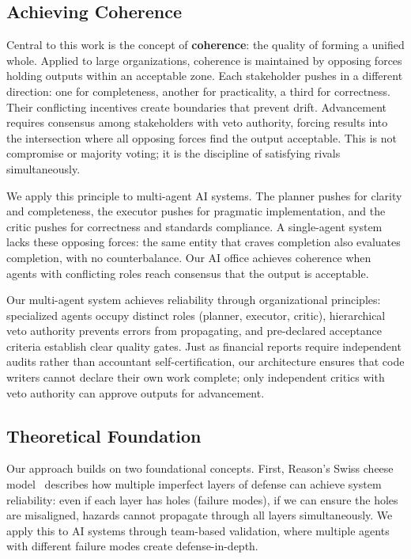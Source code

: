 \documentclass[sigconf]{acmart}
\newcommand{\reviewnote}[1]{}
\newcommand{\reviewnote}[1]{\marginnote{\raggedright\footnotesize\textit{#1}}}
\begin{document}
\subsection{Achieving Coherence}

Central to this work is the concept of \textbf{coherence}: the quality of forming a unified whole. Applied to large organizations, coherence is maintained by opposing forces holding outputs within an acceptable zone. Each stakeholder pushes in a different direction: one for completeness, another for practicality, a third for correctness. Their conflicting incentives create boundaries that prevent drift. Advancement requires consensus among stakeholders with veto authority, forcing results into the intersection where all opposing forces find the output acceptable. This is not compromise or majority voting; it is the discipline of satisfying rivals simultaneously.

We apply this principle to multi-agent AI systems. The planner pushes for clarity and completeness, the executor pushes for pragmatic implementation, and the critic pushes for correctness and standards compliance. A single-agent system lacks these opposing forces: the same entity that craves completion also evaluates completion, with no counterbalance. Our AI office achieves coherence when agents with conflicting roles reach consensus that the output is acceptable.

Our multi-agent system achieves reliability through organizational principles: specialized agents occupy distinct roles (planner, executor, critic), hierarchical veto authority prevents errors from propagating, and pre-declared acceptance criteria establish clear quality gates.\reviewnote{Clear contribution. Consider adding upfront: "We demonstrate 92.1\% error recovery on 522 production sessions" to establish scale immediately.} Just as financial reports require independent audits rather than accountant self-certification, our architecture ensures that code writers cannot declare their own work complete; only independent critics with veto authority can approve outputs for advancement.

\subsection{Theoretical Foundation}

Our approach builds on two foundational concepts. First, Reason's Swiss cheese model~\cite{Reason1990} describes how multiple imperfect layers of defense can achieve system reliability: even if each layer has holes (failure modes), if we can ensure the holes are misaligned, hazards cannot propagate through all layers simultaneously. We apply this to AI systems through team-based validation, where multiple agents with different failure modes create defense-in-depth.
\end{document}
